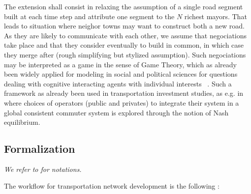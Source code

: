 The extension shall consist in relaxing the assumption of a single road segment built at each time step and attribute one segment to the $N$ richest mayors. That leads to situation where neighor towns may want to construct both a new road. As they are likely to communicate with each other, we assume that negociations take place and that they consider eventually to build in common, in which case they merge after (rough simplifying but stylized assumption). Such negociations may be interpreted as a game in the sense of Game Theory, which as already been widely applied for modeling in social and political sciences for questions dealing with cognitive interacting agents with individual interests~\cite{ordeshook1986game}
. Such a framework as already been used in transportation investment studies, as e.g. in~\cite{Roumboutsos2008209} where choices of operators (public and privates) to integrate their system in a global consistent commuter system is explored through the notion of Nash equilibrium.




\subsection*{Formalization}

\textit{We refer to \cite{lenechet2012} for notations.}
\medskip

The workflow for transportation network development is the following :

